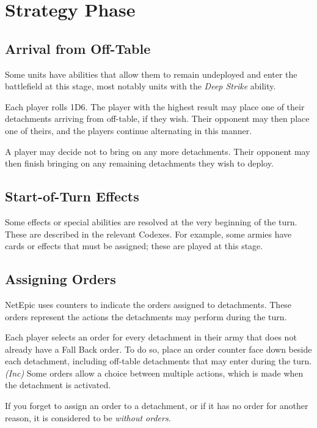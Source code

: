 \section{Strategy Phase}

\subsection{Arrival from Off-Table}

Some units have abilities that allow them to remain undeployed and enter the battlefield at this stage, most notably units with the \textit{Deep Strike} ability.

Each player rolls 1D6. The player with the highest result may place one of their detachments arriving from off-table, if they wish. Their opponent may then place one of theirs, and the players continue alternating in this manner.

A player may decide not to bring on any more detachments. Their opponent may then finish bringing on any remaining detachments they wish to deploy.

\subsection{Start-of-Turn Effects}

Some effects or special abilities are resolved at the very beginning of the turn. These are described in the relevant Codexes. For example, some armies have cards or effects that must be assigned; these are played at this stage.

\subsection{Assigning Orders}

NetEpic uses counters to indicate the orders assigned to detachments. These orders represent the actions the detachments may perform during the turn.

Each player selects an order for every detachment in their army that does not already have a Fall Back order. To do so, place an order counter face down beside each detachment, including off-table detachments that may enter during the turn. \textit{(Inc)} Some orders allow a choice between multiple actions, which is made when the detachment is activated.

If you forget to assign an order to a detachment, or if it has no order for another reason, it is considered to be \textit{without orders}.

